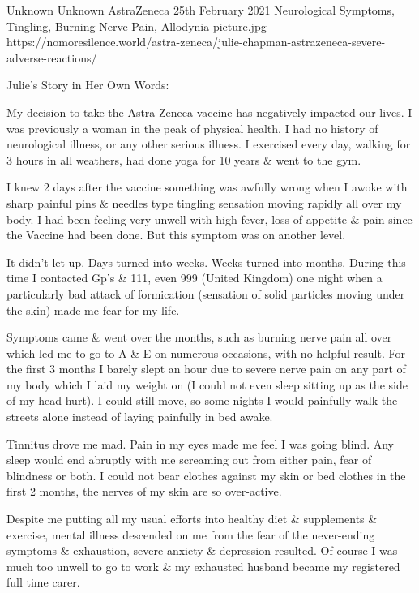 {Unknown}
{Unknown}
{AstraZeneca}
{25th February 2021}
{Neurological Symptoms, Tingling, Burning Nerve Pain, Allodynia}
{picture.jpg}
{https://nomoresilence.world/astra-zeneca/julie-chapman-astrazeneca-severe-adverse-reactions/}
{

\normalsize

Julie’s Story in Her Own Words:

My decision to take the Astra Zeneca vaccine has negatively impacted our
lives. I was previously a woman in the peak of physical health. I had no history
of neurological illness, or any other serious illness. I exercised every day,
walking for 3 hours in all weathers, had done yoga for 10 years \& went to the
gym.

I knew 2 days after the vaccine something was awfully wrong when I awoke with
sharp painful pins \& needles type tingling sensation moving rapidly all over my
body. I had been feeling very unwell with high fever, loss of appetite \& pain
since the Vaccine had been done. But this symptom was on another level.

It didn’t let up. Days turned into weeks. Weeks turned into months. During this
time I contacted Gp’s \& 111, even 999 (United Kingdom) one night when a
particularly bad attack of formication (sensation of solid particles moving
under the skin) made me fear for my life.

Symptoms came \& went over the months, such as burning nerve pain all over which
led me to go to A \& E on numerous occasions, with no helpful result. For the
first 3 months I barely slept an hour due to severe nerve pain on any part of my
body which I laid my weight on (I could not even sleep sitting up as the side of
my head hurt). I could still move, so some nights I would painfully walk the
streets alone instead of laying painfully in bed awake.

Tinnitus drove me mad. Pain in my eyes made me feel I was going blind. Any sleep
would end abruptly with me screaming out from either pain, fear of blindness or
both. I could not bear clothes against my skin or bed clothes in the first 2
months, the nerves of my skin are so over-active.

Despite me putting all my usual efforts into healthy diet \& supplements \&
exercise, mental illness descended on me from the fear of the never-ending
symptoms \& exhaustion, severe anxiety \& depression resulted. Of course I was
much too unwell to go to work \& my exhausted husband became my registered full
time carer.

}
